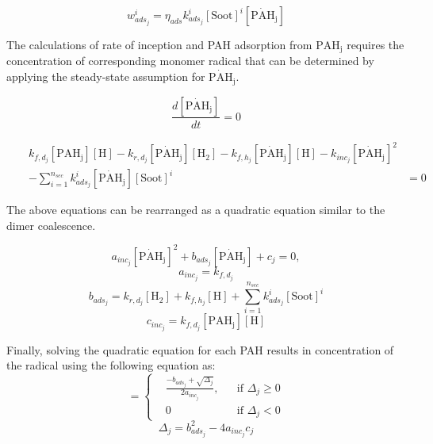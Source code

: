 \begin{equation}
	w^i_{ads_j} = \eta_{ads} k^i_{ads_{j}} [\mathrm{Soot}]^i [\mathrm{\dot{PAH}_j}]
\end{equation}

The calculations of rate of inception and PAH adsorption from $\mathrm{PAH_j}$ requires the concentration of corresponding monomer radical that can be determined by applying the steady-state assumption for $\mathrm{\dot{PAH}_j}$.

\begin{equation}
	\frac{d[\mathrm{\dot{PAH}_j}]}{dt} = 0
\end{equation}

\begin{equation}
	\begin{aligned}
		&&k_{f,d_j}[\mathrm{PAH_j}][\mathrm{H}]
		-k_{r,d_j}[\mathrm{\dot{PAH}_j}][\mathrm{H_2}]
		-k_{f,h_j}[\mathrm{\dot{PAH}_j}][\mathrm{H}]
		-k_{inc_j}[\mathrm{\dot{PAH}_j}]^2 &\\
		&&-\sum_{i=1}^{n_{sec}}k^i_{ads_j}[\mathrm{\dot{PAH}_j}][\mathrm{Soot}]^i
		&= 0
	\end{aligned}
\end{equation}

The above equations can be rearranged as a quadratic equation similar to the dimer coalescence.

\begin{equation}
	a_{inc_j}[\mathrm{\dot{PAH}_j}]^2+
	b_{ads_j}[\mathrm{\dot{PAH}_j}] + c_j = 0,
\end{equation}
\begin{equation}
	a_{inc_j}=k_{f,d_j}
\end{equation}
\begin{equation}
	b_{ads_j}=k_{r,d_j}[\mathrm{H_2}]+k_{f,h_j}[\mathrm{H}]+\sum_{i=1}^{n_{sec}}k^i_{ads_j}[\mathrm{Soot}]^i
\end{equation}
\begin{equation}
	c_{inc_j}=k_{f,d_j}[\mathrm{PAH_j}][\mathrm{H}]
\end{equation}

Finally, solving the quadratic equation for each PAH results in concentration of the radical using the following equation as:
\begin{equation}
	[\mathrm{\mathrm{\dot{PAH}}_j}]=
	\left\{
	\begin{aligned}
		&\frac{-b_{ads_j}+\sqrt{\Delta_j}}{2a_{inc_j}},
		&&
		\text{if } \Delta_j \ge 0
		\\
		& 0 
		&&
		\text{if } \Delta_j < 0
	\end{aligned}
	\right.
	\label{eqn:rad_ebri}
\end{equation}
\begin{equation}
	\Delta_j = b_{ads_j}^2-4a_{inc_j}c_{j}
	\label{eqn:delta_ebri}
\end{equation}

